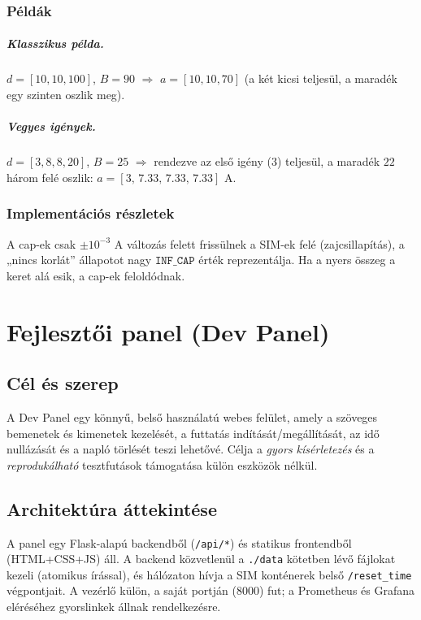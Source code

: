 \subsection{Példák}
\paragraph{Klasszikus példa.}
\(d=[10,10,100]\), \(B=90\) \(\Rightarrow\) \(a=[10,10,70]\) (a két kicsi teljesül, a maradék egy szinten oszlik meg).
\paragraph{Vegyes igények.}
\(d=[3,8,8,20]\), \(B=25\) \(\Rightarrow\) rendezve az első igény (3) teljesül, a maradék \(22\) 
három felé oszlik: \(a=[3,\,7.33,\,7.33,\,7.33]\) A.

\subsection{Implementációs részletek}
A cap-ek csak \(\pm 10^{-3}\) A változás felett frissülnek a SIM-ek felé (zajcsillapítás), 
a „nincs korlát” állapotot nagy \(\texttt{INF\_CAP}\) érték reprezentálja. Ha a nyers összeg a keret alá esik, 
a cap-ek feloldódnak.


\chapter{Fejlesztői panel (Dev Panel)}

\section{Cél és szerep}
A Dev Panel egy könnyű, belső használatú webes felület, amely a szöveges bemenetek és kimenetek kezelését, 
a futtatás indítását/megállítását, az idő nullázását és a napló törlését teszi lehetővé. Célja 
a \emph{gyors kísérletezés} és a \emph{reprodukálható} tesztfutások támogatása külön eszközök nélkül.

\section{Architektúra áttekintése}
A panel egy Flask-alapú backendből (\texttt{/api/*}) és statikus frontendből (HTML+CSS+JS) áll. 
A backend közvetlenül a \texttt{./data} kötetben lévő fájlokat kezeli (atomikus írással), 
és hálózaton hívja a SIM konténerek belső \texttt{/reset\_time} végpontjait. A vezérlő külön, 
a saját portján (\(8000\)) fut; a Prometheus és Grafana eléréséhez gyorslinkek állnak rendelkezésre.

